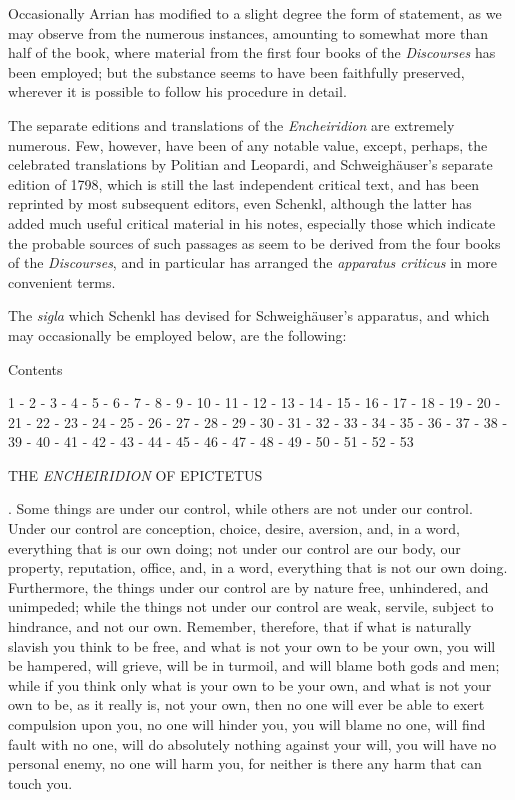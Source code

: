 Occasionally Arrian has modified to a slight degree the form of statement, as we may observe from the numerous instances, amounting to somewhat more than half of the book, where material from the first four books of the \emph{Discourses} has been employed; but the substance seems to have been faithfully preserved, wherever it is possible to follow his procedure in detail.

The separate editions and translations of the \emph{Encheiridion} are extremely numerous. Few, however, have been of any notable value, except, perhaps, the celebrated translations by Politian and Leopardi, and Schweighäuser's separate edition of 1798, which is still the last independent critical text, and has been reprinted by most subsequent editors, even Schenkl, although the latter has added much useful critical material in his notes, especially those which indicate the probable sources of such passages as seem to be derived from the four books of the \emph{Discourses}, and in particular has arranged the \emph{apparatus criticus} in more convenient terms.

The \emph{sigla} which Schenkl has devised for Schweighäuser's apparatus, and which may occasionally be employed below, are the following:

Contents

1 - 2 - 3 - 4 - 5 - 6 - 7 - 8 - 9 - 10 - 11 - 12 - 13 - 14 - 15 - 16 - 17 - 18 - 19 - 20 - 21 - 22 - 23 - 24 - 25 - 26 - 27 - 28 - 29 - 30 - 31 - 32 - 33 - 34 - 35 - 36 - 37 - 38 - 39 - 40 - 41 - 42 - 43 - 44 - 45 - 46 - 47 - 48 - 49 - 50 - 51 - 52 - 53

THE \emph{ENCHEIRIDION} OF EPICTETUS

. Some things are under our control, while others are not under our control. Under our control are conception, choice, desire, aversion, and, in a word, everything that is our own doing; not under our control are our body, our property, reputation, office, and, in a word, everything that is not our own doing. Furthermore, the things under our control are by nature free, unhindered, and unimpeded; while the things not under our control are weak, servile, subject to hindrance, and not our own. Remember, therefore, that if what is naturally slavish you think to be free, and what is not your own to be your own, you will be hampered, will grieve, will be in turmoil, and will blame both gods and men; while if you think only what is your own to be your own, and what is not your own to be, as it really is, not your own, then no one will ever be able to exert compulsion upon you, no one will hinder you, you will blame no one, will find fault with no one, will do absolutely nothing against your will, you will have no personal enemy, no one will harm you, for neither is there any harm that can touch you.

